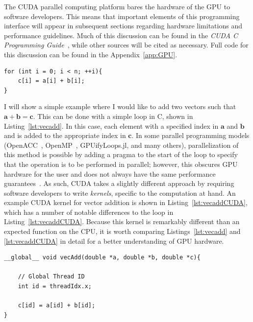 The CUDA parallel computing platform bares the hardware of the GPU to software developers.
This means that important elements of this programming interface will appear in subsequent sections regarding hardware limitations and performance guidelines.
Much of this discussion can be found in the \textit{CUDA C Programming Guide}~\cite{CUDAPG}, while other sources will be cited as necessary.
Full code for this discussion can be found in the Appendix~\ref{app:GPU}.

\begin{lstlisting}[float,label=lst:vecadd,caption={An example of vector addition performed in C or C++ for $a$, $b$, and $c$, all of size $n$},style=c++]
for (int i = 0; i < n; ++i){
    c[i] = a[i] + b[i];
}
\end{lstlisting}

I will show a simple example where I would like to add two vectors such that $\mathbf{a} + \mathbf{b} = \mathbf{c}$.
This can be done with a simple loop in C, shown in Listing~\ref{lst:vecadd}.
In this case, each element with a specified index in $\mathbf{a}$ and $\mathbf{b}$ and is added to the appropriate index in $\mathbf{c}$.
In some parallel programming models (OpenACC~\cite{wienke2012}, OpenMP~\cite{chandra2001}, GPUifyLoops.jl, and many others), parallelization of this method is possible by adding a pragma to the start of the loop to specify that the operation is to be performed in parallel; however, this obscures GPU hardware for the user and does not always have the same performance guarantees~\cite{reyes2012}.
As such, CUDA takes a slightly different approach by requiring software developers to write \textit{kernels}, specific to the computation at hand.
An example CUDA kernel for vector addition is shown in Listing~\ref{lst:vecaddCUDA}, which has a number of notable differences to the loop in Listing~\ref{lst:vecaddCUDA}.
Because this kernel is remarkably different than an expected function on the CPU, it is worth comparing Listings~\ref{lst:vecadd} and \ref{lst:vecaddCUDA} in detail for a better understanding of GPU hardware.

\begin{lstlisting}[float,label=lst:vecaddCUDA, style=c++,caption=An example of a vector addition kernel in CUDA]
__global__ void vecAdd(double *a, double *b, double *c){

    // Global Thread ID
    int id = threadIdx.x;

    c[id] = a[id] + b[id];
}
\end{lstlisting}

